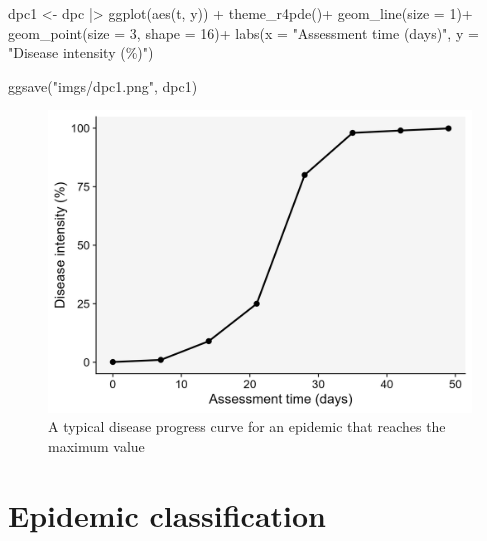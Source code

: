 \documentclass[
  letterpaper,
]{book}
\newenvironment{Shaded}{\begin{snugshade}}{\end{snugshade}}
\newcommand{\AttributeTok}[1]{\textcolor[rgb]{0.40,0.45,0.13}{#1}}
\newcommand{\DecValTok}[1]{\textcolor[rgb]{0.68,0.00,0.00}{#1}}
\newcommand{\FunctionTok}[1]{\textcolor[rgb]{0.28,0.35,0.67}{#1}}
\newcommand{\NormalTok}[1]{\textcolor[rgb]{0.00,0.23,0.31}{#1}}
\newcommand{\OtherTok}[1]{\textcolor[rgb]{0.00,0.23,0.31}{#1}}
\newcommand{\SpecialCharTok}[1]{\textcolor[rgb]{0.37,0.37,0.37}{#1}}
\newcommand{\StringTok}[1]{\textcolor[rgb]{0.13,0.47,0.30}{#1}}
\begin{document}
\begin{Shaded}
\begin{Highlighting}[]
\NormalTok{dpc1 }\OtherTok{\textless{}{-}}\NormalTok{ dpc }\SpecialCharTok{|\textgreater{}}
  \FunctionTok{ggplot}\NormalTok{(}\FunctionTok{aes}\NormalTok{(t, y)) }\SpecialCharTok{+}
  \FunctionTok{theme\_r4pde}\NormalTok{()}\SpecialCharTok{+}
  \FunctionTok{geom\_line}\NormalTok{(}\AttributeTok{size =} \DecValTok{1}\NormalTok{)}\SpecialCharTok{+}
  \FunctionTok{geom\_point}\NormalTok{(}\AttributeTok{size =} \DecValTok{3}\NormalTok{, }\AttributeTok{shape =} \DecValTok{16}\NormalTok{)}\SpecialCharTok{+}
  \FunctionTok{labs}\NormalTok{(}\AttributeTok{x =} \StringTok{"Assessment time (days)"}\NormalTok{,}
       \AttributeTok{y =} \StringTok{"Disease intensity (\%)"}\NormalTok{)}

\FunctionTok{ggsave}\NormalTok{(}\StringTok{"imgs/dpc1.png"}\NormalTok{, dpc1)}
\end{Highlighting}
\end{Shaded}

\begin{figure}

{\centering \includegraphics{imgs/dpc1.png}

}

\caption{\label{fig-dpc1}A typical disease progress curve for an
epidemic that reaches the maximum value}

\end{figure}

\hypertarget{epidemic-classification}{%
\section{Epidemic classification}\label{epidemic-classification}}
\end{document}
